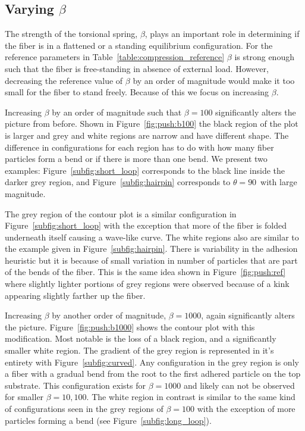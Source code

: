 \subsection{Varying $\beta$}

The strength of the torsional spring, $\beta$, plays an important role in determining if the fiber is in a flattened or a standing equilibrium configuration. For the reference parameters in Table~\ref{table:compression_reference} $\beta$ is strong enough such that the fiber is free-standing in absence of external load. However, decreasing the reference value of $\beta$ by an order of magnitude would make it too small for the fiber to stand freely. Because of this we focus on increasing $\beta$.

Increasing $\beta$ by an order of magnitude such that $\beta=100$ significantly alters the picture from before. Shown in Figure~\ref{fig:push:b100} the black region of the plot is larger and grey and white regions are narrow and have different shape. The difference in configurations for each region has to do with how many fiber particles form a bend or if there is more than one bend. We present two examples: Figure~\ref{subfig:short_loop} corresponds to the black line inside the darker grey region, and Figure~\ref{subfig:hairpin} corresponds to $\theta=90$\textdegree\ with large magnitude.

The grey region of the contour plot is a similar configuration in Figure~\ref{subfig:short_loop} with the exception that more of the fiber is folded underneath itself causing a wave-like curve. The white regions also are similar to the example given in Figure~\ref{subfig:hairpin}. There is variability in the adhesion heuristic but it is because of small variation in number of particles that are part of the bends of the fiber. This is the same idea shown in Figure~\ref{fig:push:ref} where slightly lighter portions of grey regions were observed because of a kink appearing slightly farther up the fiber.

Increasing $\beta$ by another order of magnitude, $\beta=1000$, again significantly alters the picture. Figure~\ref{fig:push:b1000} shows the contour plot with this modification. Most notable is the loss of a black region, and a significantly smaller white region. The gradient of the grey region is represented in it's entirety with Figure~\ref{subfig:curved}. Any configuration in the grey region is only a fiber with a gradual bend from the root to the first adhered particle on the top substrate. This configuration exists for $\beta=1000$ and likely can not be observed for smaller $\beta=10, 100$. The white region in contrast is similar to the same kind of configurations seen in the grey regions of $\beta=100$ with the exception of more particles forming a bend (see Figure~\ref{subfig:long_loop}).


